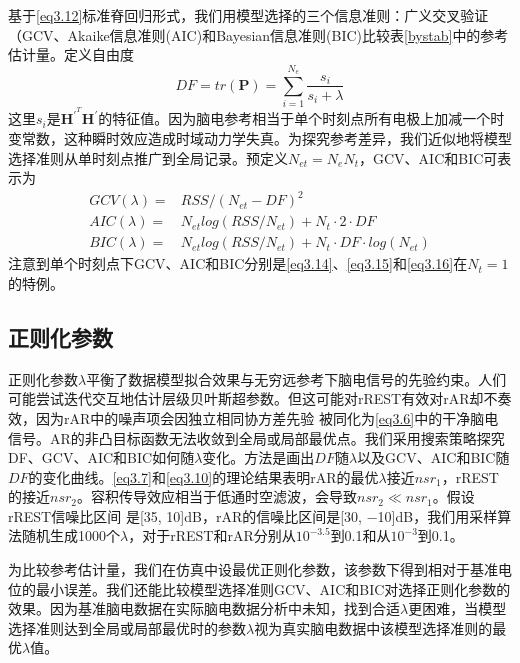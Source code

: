 基于\eqref{eq3.12}标准脊回归形式，我们用模型选择的三个信息准则：广义交叉验证（GCV、Akaike信息准则(AIC)和Bayesian信息准则(BIC)比较表\ref{bystab}中的参考估计量。定义自由度
\begin{equation}
DF=tr(\mathbf{P})=\sum_{i=1}^{N_{e}}\dfrac{s_i}{s_i+\lambda}
\end{equation}
这里$s_i$是$\mathbf{H}^{\prime^T}\mathbf{H}^\prime$的特征值。因为脑电参考相当于单个时刻点所有电极上加减一个时变常数，这种瞬时效应造成时域动力学失真。为探究参考差异，我们近似地将模型选择准则从单时刻点推广到全局记录。预定义$N_{et}=N_eN_t$，GCV、AIC和BIC可表示为
\begin{align}
GCV(\lambda)={} &RSS/(N_{et}-DF)^2\label{eq3.14}\\
AIC(\lambda)={} &N_{et}log(RSS/{N_{et}})+N_t\cdot{2}\cdot{DF}\label{eq3.15}\\
BIC(\lambda)={} &N_{et}log(RSS/{N_{et}})+N_t\cdot{DF}\cdot{log(N_{et})}\label{eq3.16}
\end{align}
注意到单个时刻点下GCV、AIC和BIC分别是\eqref{eq3.14}、\eqref{eq3.15}和\eqref{eq3.16}在$N_t=1$的特例。
\subsection{正则化参数}
正则化参数$\lambda$平衡了数据模型拟合效果与无穷远参考下脑电信号的先验约束。人们可能尝试迭代交互地估计层级贝叶斯超参数。但这可能对rREST有效对rAR却不奏效，因为rAR中的噪声项会因独立相同协方差先验
被同化为\eqref{eq3.6}中的干净脑电信号。AR的非凸目标函数无法收敛到全局或局部最优点。我们采用搜索策略探究DF、GCV、AIC和BIC如何随$\lambda$变化。方法是画出$DF$随$\lambda$以及GCV、AIC和BIC随$DF$的变化曲线。\eqref{eq3.7}和\eqref{eq3.10}的理论结果表明rAR的最优$\lambda$接近$nsr_1$，rREST的接近$nsr_2$。容积传导效应相当于低通时空滤波，会导致$nsr_2\ll{nsr_1}$。假设rREST信噪比区间
是[35, 10]dB，rAR的信噪比区间是[30, −10]dB，我们用采样算法随机生成1000个$\lambda$，对于rREST和rAR分别从$10^{-3.5}$到0.1和从$10^{-3}$到0.1。

为比较参考估计量，我们在仿真中设最优正则化参数，该参数下得到相对于基准电位的最小误差。我们还能比较模型选择准则GCV、AIC和BIC对选择正则化参数的效果。因为基准脑电数据在实际脑电数据分析中未知，找到合适$\lambda$更困难，当模型选择准则达到全局或局部最优时的参数$\lambda$视为真实脑电数据中该模型选择准则的最优$\lambda$值。

